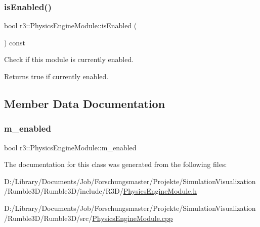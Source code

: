\subsubsection{\texorpdfstring{is\+Enabled()}{isEnabled()}}
{\footnotesize\ttfamily bool r3\+::\+Physics\+Engine\+Module\+::is\+Enabled (\begin{DoxyParamCaption}{ }\end{DoxyParamCaption}) const}

Check if this module is currently enabled. \begin{DoxyReturn}{Returns}
true if currently enabled. 
\end{DoxyReturn}


\subsection{Member Data Documentation}
\mbox{\label{classr3_1_1_physics_engine_module_a9697a77e77dc5dd5990b16876ad413bf}} 
\subsubsection{\texorpdfstring{m\+\_\+enabled}{m\_enabled}}
{\footnotesize\ttfamily bool r3\+::\+Physics\+Engine\+Module\+::m\+\_\+enabled\hspace{0.3cm}{\ttfamily [protected]}}



The documentation for this class was generated from the following files\+:\begin{DoxyCompactItemize}
\item 
D\+:/\+Library/\+Documents/\+Job/\+Forschungsmaster/\+Projekte/\+Simulation\+Visualization/\+Rumble3\+D/\+Rumble3\+D/include/\+R3\+D/\mbox{\hyperlink{_physics_engine_module_8h}{Physics\+Engine\+Module.\+h}}\item 
D\+:/\+Library/\+Documents/\+Job/\+Forschungsmaster/\+Projekte/\+Simulation\+Visualization/\+Rumble3\+D/\+Rumble3\+D/src/\mbox{\hyperlink{_physics_engine_module_8cpp}{Physics\+Engine\+Module.\+cpp}}\end{DoxyCompactItemize}
